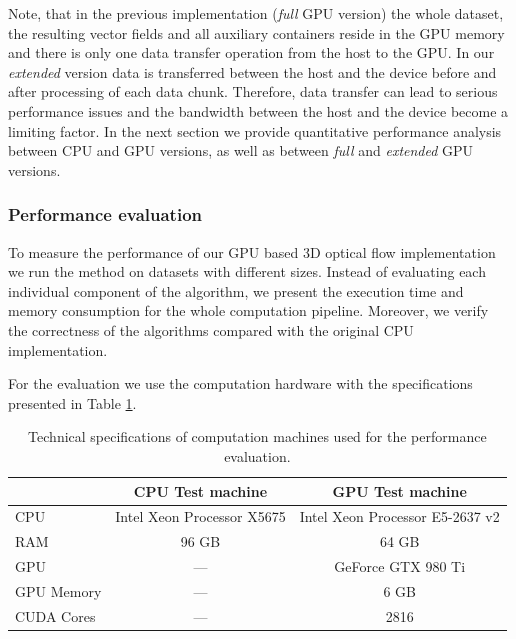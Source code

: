 Note, that in the previous implementation (\textit{full} GPU version) the whole dataset, the resulting vector fields and all auxiliary containers reside in the GPU memory and there is only one data transfer operation from the host to the GPU. In our \textit{extended} version data is transferred between the host and the device before and after processing of each data chunk. Therefore, data transfer can lead to serious performance issues and the bandwidth between the host and the device become a limiting factor. In the next section we provide quantitative performance analysis between CPU and GPU versions, as well as between \textit{full} and \textit{extended} GPU versions.


\subsubsection{Performance evaluation}

To measure the performance of our GPU based 3D optical flow implementation we run the method on datasets with different sizes. Instead of evaluating each individual component of the algorithm, we present the execution time and memory consumption for the whole computation pipeline. Moreover, we verify the correctness of the algorithms compared with the original CPU implementation.   

For the evaluation we use the computation hardware with the specifications presented in Table \ref{tbl:test-machines}.

\begin{table}[h] \scriptsize
	\centering
	\begin{tabular}{l c c}
		\hline
		& CPU Test machine           & GPU Test machine                                                                                  \\
		
		\hline
		CPU        & Intel Xeon Processor X5675 & Intel Xeon Processor E5-2637 v2                                                                   \\
		RAM        & 96 GB                      & 64 GB                                                                                             \\
		GPU        & ---                        & GeForce GTX 980 Ti
		 \\
		GPU Memory & ---                        & 6 GB                                                                                              \\
		CUDA Cores & ---                        & 2816                                                                                             
	\end{tabular}
	\caption{Technical specifications of computation machines used for the performance evaluation.}
	\label{tbl:test-machines}
\end{table}

